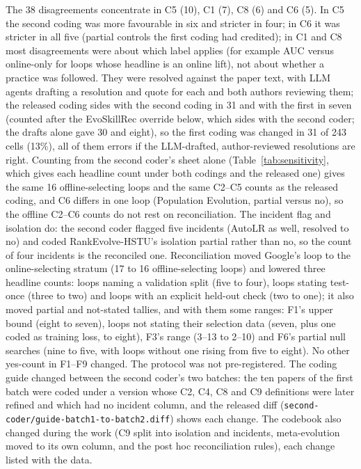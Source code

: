 \documentclass[sigconf,nonacm]{acmart}
\begin{document}
The 38 disagreements concentrate in C5 (10), C1 (7), C8 (6) and C6 (5). In C5 the second coding was more favourable
in six and stricter in four; in C6 it was stricter in all five (partial controls the first coding had credited); in C1
and C8 most disagreements were about which label applies (for example AUC versus online-only for loops whose headline
is an online lift), not about whether a practice was followed. They were resolved against the paper text, with LLM
agents drafting a resolution and quote for each and both authors reviewing them; the released coding sides with the second coding in 31 and with the first in
seven (counted after the EvoSkillRec override below, which sides with the second coder; the drafts alone gave 30 and eight), so the first coding was changed in 31 of 243 cells (13\%), all of them errors if the LLM-drafted, author-reviewed resolutions are right. Counting from the second coder's sheet alone (Table~\ref{tab:sensitivity}, which gives each headline count under both codings and the released one) gives the same 16 offline-selecting loops and the same C2--C5 counts as the released coding, and C6 differs in one loop (Population Evolution, partial versus no), so the offline C2--C6 counts do not rest on reconciliation. The incident flag and isolation do: the second coder flagged five incidents (AutoLR as well, resolved to no) and coded RankEvolve-HSTU's isolation partial rather than no, so the count of four incidents is the reconciled one. Reconciliation moved Google's loop to the online-selecting stratum (17 to 16
offline-selecting loops) and lowered three headline counts: loops naming a validation split (five to four), loops
stating test-once (three to two) and loops with an explicit held-out check (two to one); it also moved
partial and not-stated tallies, and with them some ranges: F1's upper bound (eight to seven), loops not stating their
selection data (seven, plus one coded as training loss, to eight), F3's range (3--13 to 2--10) and F6's partial null
searches (nine to five, with loops without one rising from five to eight). No other yes-count in F1--F9 changed. The protocol was not pre-registered. The coding guide changed between the second coder's two batches: the ten papers of the first batch were coded under a version whose C2, C4, C8 and C9 definitions were later refined and which had no incident column, and the released diff (\texttt{second-coder/guide-batch1-to-batch2.diff}) shows each change. The codebook also changed during the work (C9 split into isolation and incidents, meta-evolution moved to its own column, and the post hoc reconciliation rules), each change listed with the data.
\end{document}
